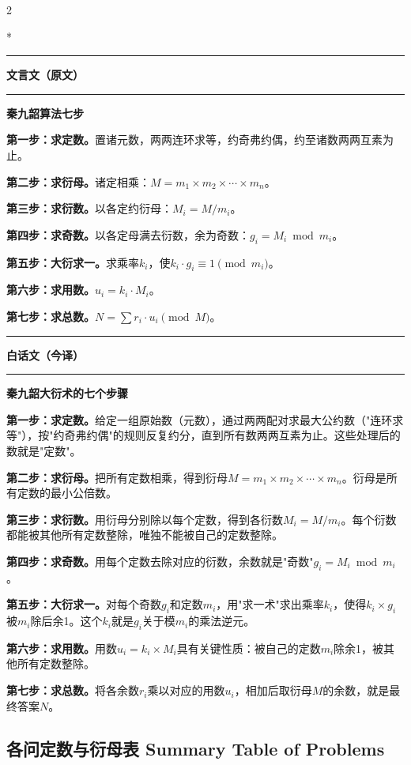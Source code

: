 \documentclass[11pt,a4paper]{article}
\newcommand{\zhtext}[1]{{\chinese #1}}
\newcommand{\leftcolheader}{%
  \noindent\textcolor{leftheader}{\rule{\columnwidth}{1.5pt}}\par
  \vspace{2pt}
  \noindent\textbf{\color{leftheader}\chinese 文言文（原文）}\par
  \vspace{2pt}
  \noindent\textcolor{leftheader}{\rule{\columnwidth}{0.6pt}}\par
  \vspace{4pt}
}
\newcommand{\rightcolheader}{%
  \noindent\textcolor{rightheader}{\rule{\columnwidth}{1.5pt}}\par
  \vspace{2pt}
  \noindent\textbf{\color{rightheader}\chinese 白话文（今译）}\par
  \vspace{2pt}
  \noindent\textcolor{rightheader}{\rule{\columnwidth}{0.6pt}}\par
  \vspace{4pt}
}
\begin{document}
\begin{paracol}{2}

\switchcolumn[0]*\leftcolheader

\small
\textbf{\zhtext{秦九韶算法七步}}

\textbf{第一步：求定数。}置诸元数，两两连环求等，约奇弗约偶，约至诸数两两互素为止。

\textbf{第二步：求衍母。}诸定相乘：$M = m_1 \times m_2 \times \cdots \times m_n$。

\textbf{第三步：求衍数。}以各定约衍母：$M_i = M / m_i$。

\textbf{第四步：求奇数。}以各定母满去衍数，余为奇数：$g_i = M_i \bmod m_i$。

\textbf{第五步：大衍求一。}求乘率$k_i$，使$k_i \cdot g_i \equiv 1 \pmod{m_i}$。

\textbf{第六步：求用数。}$u_i = k_i \cdot M_i$。

\textbf{第七步：求总数。}$N = \sum r_i \cdot u_i \pmod{M}$。

\switchcolumn\rightcolheader

\small\color{prefacecolor}
\textbf{秦九韶大衍术的七个步骤}

\textbf{第一步：求定数。}给定一组原始数（元数），通过两两配对求最大公约数（"连环求等"），按"约奇弗约偶"的规则反复约分，直到所有数两两互素为止。这些处理后的数就是"定数"。

\textbf{第二步：求衍母。}把所有定数相乘，得到衍母$M = m_1 \times m_2 \times \cdots \times m_n$。衍母是所有定数的最小公倍数。

\textbf{第三步：求衍数。}用衍母分别除以每个定数，得到各衍数$M_i = M / m_i$。每个衍数都能被其他所有定数整除，唯独不能被自己的定数整除。

\textbf{第四步：求奇数。}用每个定数去除对应的衍数，余数就是"奇数"$g_i = M_i \bmod m_i$。

\textbf{第五步：大衍求一。}对每个奇数$g_i$和定数$m_i$，用"求一术"求出乘率$k_i$，使得$k_i \times g_i$被$m_i$除后余1。这个$k_i$就是$g_i$关于模$m_i$的乘法逆元。

\textbf{第六步：求用数。}用数$u_i = k_i \times M_i$具有关键性质：被自己的定数$m_i$除余1，被其他所有定数整除。

\textbf{第七步：求总数。}将各余数$r_i$乘以对应的用数$u_i$，相加后取衍母$M$的余数，就是最终答案$N$。

\end{paracol}

\subsection*{\zhtext{各问定数与衍母表} Summary Table of Problems}
\end{document}
